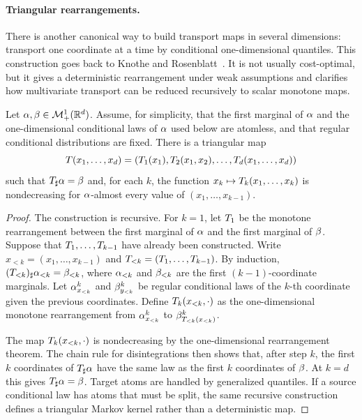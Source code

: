 \paragraph{Triangular rearrangements.}

There is another canonical way to build transport maps in several dimensions: transport one coordinate at a time by conditional one-dimensional quantiles. This construction goes back to Knothe and Rosenblatt~\cite{Knothe1957,Rosenblatt1952}. It is not usually cost-optimal, but it gives a deterministic rearrangement under weak assumptions and clarifies how multivariate transport can be reduced recursively to scalar monotone maps.

\begin{prop}\label{prop-knothe-rosenblatt}
	Let $\alpha,\beta\in\mathcal{M}_+^1(\mathbb{R}^d)$. Assume, for simplicity, that the first marginal of $\alpha$ and the one-dimensional conditional laws of $\alpha$ used below are atomless, and that regular conditional distributions are fixed. There is a triangular map
	\[
		T(x_1,\ldots,x_d)
		=
		(T_1(x_1),T_2(x_1,x_2),\ldots,T_d(x_1,\ldots,x_d))
	\]
	such that $T_\sharp\alpha=\beta$ and, for each $k$, the function $x_k\mapsto T_k(x_1,\ldots,x_k)$ is nondecreasing for $\alpha$-almost every value of $(x_1,\ldots,x_{k-1})$.
\end{prop}
\begin{proof}
	The construction is recursive. For $k=1$, let $T_1$ be the monotone rearrangement between the first marginal of $\alpha$ and the first marginal of $\beta$. Suppose that $T_1,\ldots,T_{k-1}$ have already been constructed. Write $x_{<k}=(x_1,\ldots,x_{k-1})$ and $T_{<k}=(T_1,\ldots,T_{k-1})$. By induction, $(T_{<k})_\sharp\alpha_{<k}=\beta_{<k}$, where $\alpha_{<k}$ and $\beta_{<k}$ are the first $(k-1)$-coordinate marginals. Let $\alpha^k_{x_{<k}}$ and $\beta^k_{y_{<k}}$ be regular conditional laws of the $k$-th coordinate given the previous coordinates. Define $T_k(x_{<k},\cdot)$ as the one-dimensional monotone rearrangement from $\alpha^k_{x_{<k}}$ to $\beta^k_{T_{<k}(x_{<k})}$.

	The map $T_k(x_{<k},\cdot)$ is nondecreasing by the one-dimensional rearrangement theorem. The chain rule for disintegrations then shows that, after step $k$, the first $k$ coordinates of $T_\sharp\alpha$ have the same law as the first $k$ coordinates of $\beta$. At $k=d$ this gives $T_\sharp\alpha=\beta$. Target atoms are handled by generalized quantiles. If a source conditional law has atoms that must be split, the same recursive construction defines a triangular Markov kernel rather than a deterministic map.
\end{proof}

